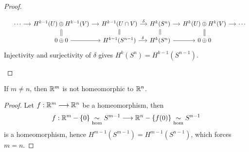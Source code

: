 \begin{proof}
\begin{enumerate}[label=({\itshape \arabic*})]
\[            \begin{tikzcd}[sep=small]
                & \cdots \ar{r}
                & H^{k-1}(U)\oplus H^{k-1}(V) \ar{r} \ar[equals]{d}
                & H^{k-1}(U\cap V) \ar{r}{\delta} \ar[equals]{d}
                & H^k(S^n) \ar{r} \ar[equals]{d}
                & H^k(U)\oplus H^k(V) \ar{r} \ar[equals]{d}
                & \cdots \\
                & 
                & 0\oplus 0 \ar{r}
                & H^{k-1}(S^{n-1}) \ar{r}{\delta}
                & H^k(S^n) \ar{r}
                & 0 \oplus 0
            \end{tikzcd}
        \]
        Injectivity and surjectivity of \(\delta\) gives \(H^k(S^n) = H^{k-1}(S^{n-1})\).
    \end{enumerate}
\end{proof}

\begin{corollary}
    If \(m\neq n\), then \(\mathbb{R}^m\) is not homeomorphic to \(\mathbb{R}^n\).
\end{corollary}
\begin{proof}
    Let \(f:\mathbb{R}^m\longrightarrow\mathbb{R}^n\) be a homeomorphism, then \[
        f:\mathbb{R}^m\mathbin{-}\{0\}\underset{\mathrm{hom}}{\sim} S^{m-1}\longrightarrow\mathbb{R}^n\mathbin{-}\{f(0)\}\underset{\mathrm{hom}}{\sim} S^{n-1}
    \] is a homeomorphism, hence \(H^{m-1}(S^{m-1}) = H^{m-1}(S^{n-1})\), which forces \(m = n\).
\end{proof}


